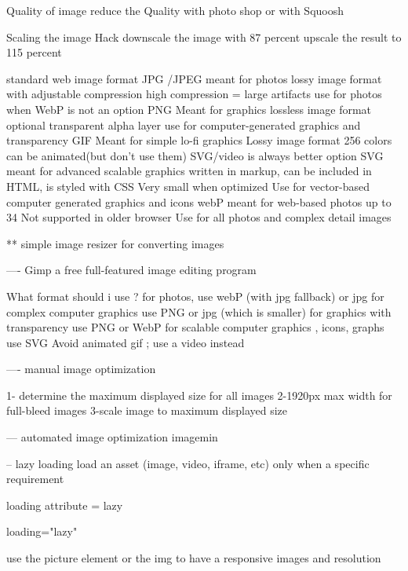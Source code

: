 Quality of image 
  reduce the Quality with photo shop 
  or with Squoosh 

  Scaling the image Hack 
  downscale the image with 87 percent 
  upscale the result to 115 percent 

  standard web image format 
    JPG /JPEG 
      meant for photos 
      lossy image format with adjustable compression 
      high compression = large artifacts
      use for photos when WebP is not an option 
    PNG
      Meant for graphics 
      lossless image format 
      optional transparent alpha layer 
      use for computer-generated graphics and transparency 
    GIF
      Meant for simple lo-fi graphics 
      Lossy image format 
      256 colors 
      can be animated(but don't use them)
      SVG/video is always better option 
    SVG     
      meant for advanced scalable graphics 
      written in markup, can be included in HTML, is styled with CSS 
      Very small when optimized 
      Use for vector-based computer generated graphics and icons
    webP
      meant for web-based photos 
      up to 34%
      Not supported in older browser 
      Use for all photos and complex detail images 


** simple image resizer 
  for converting images 

---- Gimp 
a free full-featured image editing program

What format should i use ? 
for photos, use webP (with jpg fallback) or jpg 
for complex computer graphics use PNG or jpg (which is smaller)
for graphics with transparency use PNG or WebP
for scalable computer graphics , icons, graphs use SVG 
Avoid animated gif ; use a video instead 

---- manual image optimization 

1- determine the maximum displayed size for all images 
2-1920px max width for full-bleed images
3-scale image to maximum displayed size 

--- automated image optimization 
  imagemin 


-- lazy loading 
load an asset (image, video, iframe, etc) only when a specific requirement 

loading attribute = lazy   

loading="lazy" 

use the picture element or the img to have a responsive images and resolution 

